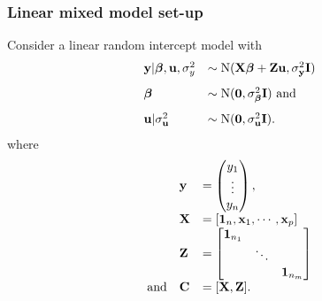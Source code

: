 \documentclass{beamer}
\begin{document}
\begin{frame}
	\frametitle{Linear mixed model set-up}

	
	Consider a linear random intercept model with
	$$
	\begin{array}{ll}
		{\bf y}|{\boldsymbol \beta},{\bf u},\sigma_y^2 & \sim \text{N}({\bf X} {\boldsymbol \beta} + {\bf Z} {\bf u}, \sigma_{\bf y}^2 {\bf I})  \\[2ex]
		{\boldsymbol\beta}                    & \sim \text{N}({\bf 0}, \sigma_{\boldsymbol \beta}^2 {\bf I}) \text{ and} \\[2ex]
		{\bf u}|\sigma_{{\bf u}}^2        & \sim \text{N}({\bf 0}, \sigma_{{\bf u}}^2 {\bf I}).             
	\end{array}
	$$
	\noindent where
	$$
	\begin{array}{rll}
		            & {\bf y}    & =                                 
		\begin{pmatrix}
		y_1 \\
		\vdots \\
		y_n
		\end{pmatrix}, \\[2ex]
		            & {\bf X}    & = [{\bf 1}_n, {\bf x}_1, \cdots, {\bf x}_p] \\
		            & {\bf Z}    & =                                 
		\begin{bmatrix}
		{\bf1}_{n_1} &        &                                   \\
		            & \ddots &                                   \\
		            &        & {\bf 1}_{n_m}                       
		\end{bmatrix} \\
		\text{and}  & {\bf C}    & = [{\bf X}, {\bf Z}].                     
	\end{array}
	$$
\end{frame}
\end{document}
